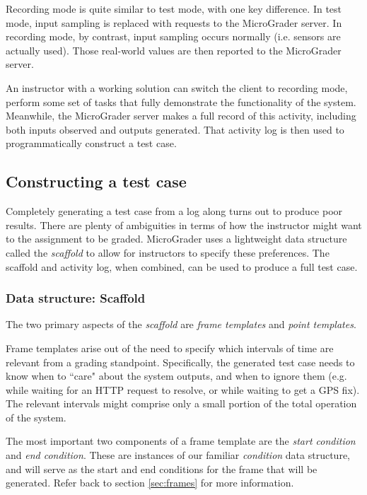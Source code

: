 \documentclass[12pt]{article}
\begin{document}
Recording mode is quite similar to test mode, with one key difference.  In test mode, input sampling is replaced with requests to the MicroGrader server.  In recording mode, by contrast, input sampling occurs normally (i.e. sensors are actually used).  Those real-world values are then reported to the MicroGrader server.

An instructor with a working solution can switch the client to recording mode, perform some set of tasks that fully demonstrate the functionality of the system.  Meanwhile, the MicroGrader server makes a full record of this activity, including both inputs observed and outputs generated.  That activity log is then used to programmatically construct a test case.

\subsection{Constructing a test case}
Completely generating a test case from a log along turns out to produce poor results.  There are plenty of ambiguities in terms of how the instructor might want to the assignment to be graded.  MicroGrader uses a lightweight data structure called the \textit{scaffold} to allow for instructors to specify these preferences.  The scaffold and activity log, when combined, can be used to produce a full test case.

\subsubsection{Data structure: Scaffold}
The two primary aspects of the \textit{scaffold} are \textit{frame templates} and \textit{point templates}.

Frame templates arise out of the need to specify which intervals of time are relevant from a grading standpoint.  Specifically, the generated test case needs to know when to ``care" about the system outputs, and when to ignore them (e.g. while waiting for an HTTP request to resolve, or while waiting to get a GPS fix).  The relevant intervals might comprise only a small portion of the total operation of the system.

The most important two components of a frame template are the \textit{start condition} and \textit{end condition}.  These are instances of our familiar \textit{condition} data structure, and will serve as the start and end conditions for the frame that will be generated.  Refer back to section \ref{sec:frames} for more information.
\end{document}
